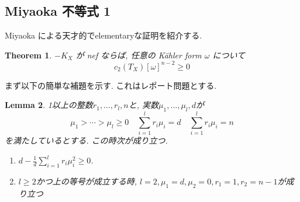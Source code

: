 \documentclass[dvipdfmx,a4paper,11pt]{article} %
\newtheorem{thm}{Theorem}[section]
\newtheorem{lem}[thm]{Lemma}
\theoremstyle{definition}
\theoremstyle{remark}
\numberwithin{equation}{section}
\begin{document}
\subsection{Miyaoka 不等式 1}
Miyaoka \cite{Miy87}による天才的でelementaryな証明を紹介する. 
\begin{thm}
\label{thm-semipositivity-1}
\(-K_X\) が nef ならば, 任意の Kähler form \(\omega\)
について
\[
c_2(T_X) [\omega]^{n-2}\geq 0
\]

\end{thm}

まず以下の簡単な補題を示す. これはレポート問題とする.
\begin{lem}
\label{lem-miyaoka-1}
1以上の整数$r_1, \ldots, r_l, n$と, 実数$\mu_1, \ldots, \mu_l, d$が
\[
\mu_1 > \cdots > \mu_l \geq 0
\quad
\sum_{i=1}^{l}r_i\mu_i=d
\quad 
\sum_{i=1}^{l}r_i\mu_i=n
\]
を満たしているとする. 
この時次が成り立つ.
\begin{enumerate}
\item  $d-\frac{1}{d} \sum_{i=1}^{l}r_i \mu_i^2 \ge 0$.
\item $l \ge 2$かつ上の等号が成立する時, $l=2,\mu_1=d, \mu_2=0,r_1=1,r_2=n-1$が成り立つ
\end{enumerate}
\end{lem}
\end{document}
